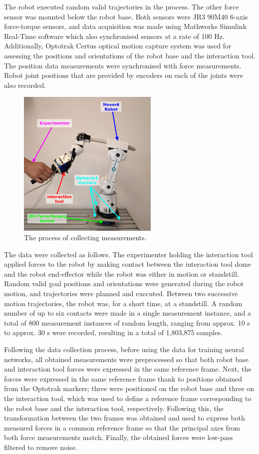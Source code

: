 The robot executed random valid trajectories in the process. The other force sensor was mounted below the robot base. Both sensors were JR3 90M40 6-axis force-torque sensors, and data acquisition was made using Mathworks Simulink Real-Time software which also synchronised sensors at a rate of 100 Hz. Additionally, Optotrak Certus optical motion capture system was used for assessing the positions and orientations of the robot base and the interaction tool. The position data measurements were synchronised with force measurements. Robot joint positions that are provided by encoders on each of the joints were also recorded.

\begin{figure}
    \centering
    \includegraphics[width=0.6\textwidth]{slike/robot}
    \caption{The process of collecting measurements.}
    \label{fig:Robot}
\end{figure}

The data were collected as follows. The experimenter holding the interaction tool applied forces to the robot by making contact between the interaction tool dome and the robot end-effector while the robot was either in motion or standstill. Random valid goal positions and orientations were generated during the robot motion, and trajectories were planned and executed. Between two successive motion trajectories, the robot was, for a short time, at a standstill. A random number of up to six contacts were made in a single measurement instance, and a total of 800 measurement instances of random length, ranging from approx. 10 s to approx. 30 s were recorded, resulting in a total of 1,803,875 samples. 

Following the data collection process, before using the data for training neural networks, all obtained measurements were preprocessed so that both robot base and interaction tool forces were expressed in the same reference frame. Next, the forces were expressed in the same reference frame thank to positions obtained from the Optotrak markers; three were positioned on the robot base and three on the interaction tool, which was used to define a reference frame corresponding to the robot base and the interaction tool, respectively. Following this, the transformation between the two frames was obtained and used to express both measured forces in a common reference frame so that the principal axes from both force measurements match. Finally, the obtained forces were low-pass filtered to remove noise.

